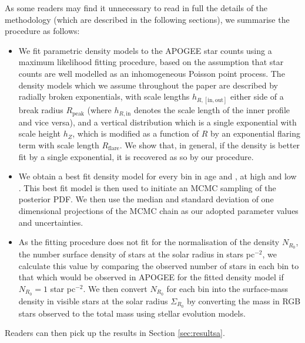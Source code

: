  As some readers may find it unnecessary to read in full the details of the methodology (which are described in the following sections), we summarise the procedure as follows:
 \begin{itemize}
 \item We fit parametric density models to the APOGEE star counts using a maximum likelihood fitting procedure, based on the assumption that star counts are well modelled as an inhomogeneous Poisson point process. The density models which we assume throughout the paper are described by radially broken exponentials, with scale lengths $h_{R,\mathrm{[in,out]}}$ either side of a break radius $R_{\mathrm{peak}}$ (where $h_{R,\mathrm{in}}$ denotes the scale length of the inner profile and vice versa), and a vertical distribution which is a single exponential with scale height $h_Z$, which is modified as a function of $R$ by an exponential flaring term with scale length $R_{\mathrm{flare}}$. We show that, in general, if the density is better fit by a single exponential, it is recovered as so by our procedure.
 \item We obtain a best fit density model for every bin in age and \feh{}, at high and low \afe{}. This best fit model is then used to initiate an MCMC sampling of the posterior PDF. We then use the median and standard deviation of one dimensional projections of the MCMC chain as our adopted parameter values and uncertainties.
 \item As the fitting procedure does not fit for the normalisation of the density $N_{R_0}$, the number surface density of stars at the solar radius in stars pc$^{-2}$, we calculate this value by comparing the observed number of stars in each bin to that which would be observed in APOGEE for the fitted density model if $N_{R_0} = 1 $ star pc$^{-2}$. We then convert $N_{R_0}$ for each bin into the surface-mass density in visible stars at the solar radius $\Sigma_{R_0}$ by converting the mass in RGB stars observed to the total mass using stellar evolution models.
\end{itemize}
 Readers can then pick up the results in Section \ref{sec:resultsa}.
 

